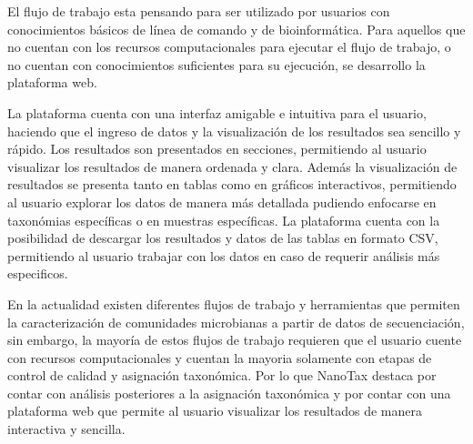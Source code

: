 El flujo de trabajo esta pensando para ser utilizado por usuarios con conocimientos básicos de línea de comando y de bioinformática.
Para aquellos que no cuentan con los recursos computacionales para ejecutar el flujo de trabajo, o no cuentan con conocimientos suficientes para su ejecución, se desarrollo la plataforma web. 

La plataforma cuenta con una interfaz amigable e intuitiva para el usuario, haciendo que el ingreso de datos y la visualización de los resultados sea sencillo y rápido.
Los resultados son presentados en secciones, permitiendo al usuario visualizar los resultados de manera ordenada y clara. 
Además la visualización de resultados se presenta tanto en tablas como en gráficos interactivos, permitiendo al usuario explorar los datos de manera más detallada pudiendo enfocarse en taxonómias específicas o en muestras específicas.
La plataforma cuenta con la posibilidad de descargar los resultados y datos de las tablas en formato CSV, permitiendo al usuario trabajar con los datos en caso de requerir análisis más especificos.


En la actualidad existen diferentes flujos de trabajo y herramientas que permiten la caracterización de comunidades microbianas a partir de datos de secuenciación, sin embargo, la mayoría de estos flujos de trabajo requieren que el usuario cuente con recursos computacionales y cuentan la mayoria solamente con etapas de control de calidad y asignación taxonómica.
Por lo que NanoTax destaca por contar con análisis posteriores a la asignación taxonómica y por contar con una plataforma web que permite al usuario visualizar los resultados de manera interactiva y sencilla.

